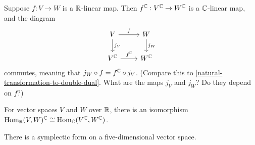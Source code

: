 \documentclass{homework}
\begin{document}
\begin{problem}
  Suppose $f : V \to W$ is a $\mathbb{R}$-linear map.  Then $f^{\mathbb{C}} : V^{\mathbb{C}} \to W^{\mathbb{C}}$ is a $\mathbb{C}$-linear map, and the diagram
  \[\begin{tikzcd}
      V \arrow{r}{f} \arrow{d}{j_V} & W \arrow{d}{j_W} \\
      V^{\C} \arrow{r}{f^{\C}}  & W^{\C}
    \end{tikzcd}\] commutes, meaning that
  $j_W \circ f = f^{\mathbb{C}} \circ j_V$.  (Compare this to
  \ref{natural-transformation-to-double-dual}.  What are the maps $j_V$ and $j_W$?  Do they depend on $f$?)
\end{problem}

\begin{problem}
  For vector spaces $V$ and $W$ over $\mathbb{R}$, there is an isomorphism \(\operatorname{Hom}_{\mathbb{R}}(V , W)^{\mathbb{C}} \cong \operatorname{Hom}_{\mathbb{C}}(V^{\mathbb{C}},W^{\mathbb{C}})\).
\end{problem}

\begin{problem}
  There is a symplectic form on a five-dimensional vector space.
\end{problem}
\end{document}
